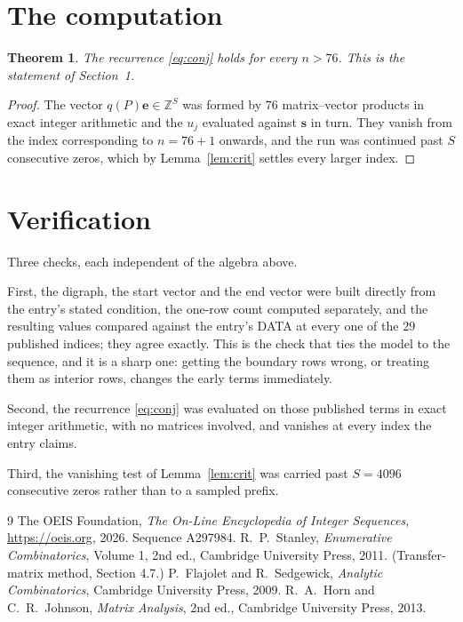 \documentclass[11pt,a4paper]{article}
\theoremstyle{plain}
\newtheorem{theorem}{Theorem}
\theoremstyle{definition}
\begin{document}
\section{The computation}

\begin{theorem}
The recurrence \eqref{eq:conj} holds for every $n>76$. This is the statement of
Section~1.
\end{theorem}

\begin{proof}
The vector $q(P)\mathbf{e}\in\mathbb{Z}^{S}$ was formed by $76$ matrix--vector
products in exact integer arithmetic and the $u_j$ evaluated against $\mathbf{s}$ in turn.
They vanish from the index corresponding to $n=76+1$ onwards, and the run was continued
past $S$ consecutive zeros, which by Lemma~\ref{lem:crit} settles every larger index.
\end{proof}

\section{Verification}

Three checks, each independent of the algebra above.

First, the digraph, the start vector and the end vector were built directly from the
entry's stated condition, the one-row count computed separately, and the resulting values
compared against the entry's DATA at every one of the $29$ published indices; they
agree exactly. This is the check that ties the model to the sequence, and it is a sharp one:
getting the boundary rows wrong, or treating them as interior rows, changes the early terms
immediately.

Second, the recurrence \eqref{eq:conj} was evaluated on those published terms in exact
integer arithmetic, with no matrices involved, and vanishes at every index the entry claims.

Third, the vanishing test of Lemma~\ref{lem:crit} was carried past $S=4096$ consecutive
zeros rather than to a sampled prefix.

\begin{thebibliography}{9}
 The OEIS Foundation, \emph{The On-Line Encyclopedia of Integer
Sequences}, \url{https://oeis.org}, 2026. Sequence A297984.
 R.~P.~Stanley, \emph{Enumerative Combinatorics}, Volume 1, 2nd ed.,
Cambridge University Press, 2011. (Transfer-matrix method, Section 4.7.)
 P.~Flajolet and R.~Sedgewick, \emph{Analytic Combinatorics}, Cambridge
University Press, 2009.
 R.~A.~Horn and C.~R.~Johnson, \emph{Matrix Analysis}, 2nd ed., Cambridge
University Press, 2013.
\end{thebibliography}
\end{document}
